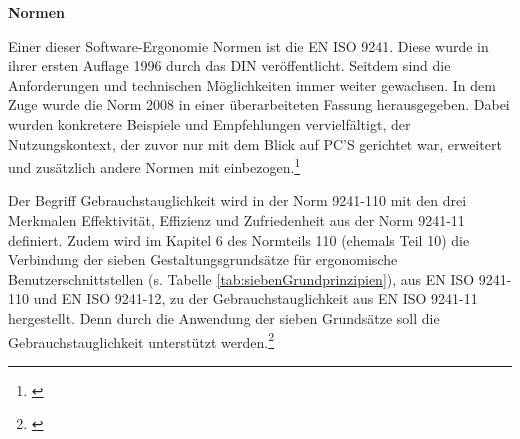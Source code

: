 \textbf{Normen}

Einer dieser Software-Ergonomie Normen ist die \gls{EN} \gls{ISO} 9241. Diese wurde in ihrer ersten Auflage 1996 durch das \gls{DIN} veröffentlicht. Seitdem sind die Anforderungen und technischen Möglichkeiten immer weiter gewachsen. In dem Zuge wurde die Norm 2008 in einer überarbeiteten Fassung herausgegeben. Dabei wurden konkretere Beispiele und Empfehlungen vervielfältigt, der Nutzungskontext, der zuvor nur mit dem Blick auf PC'S gerichtet war, erweitert und zusätzlich andere Normen mit einbezogen.\footnote{\cite[vgl.][]{Schneider2008}}

Der Begriff Gebrauchstauglichkeit wird in der Norm 9241-110 mit den drei Merkmalen Effektivität, Effizienz und Zufriedenheit aus der Norm 9241-11 definiert. Zudem wird im Kapitel 6 des Normteils 110 (ehemals Teil 10) die Verbindung der sieben Gestaltungsgrundsätze für ergonomische Benutzerschnittstellen (s. Tabelle \ref{tab:siebenGrundprinzipien}), aus EN ISO 9241-110 und EN ISO 9241-12, zu der Gebrauchstauglichkeit aus EN ISO 9241-11 hergestellt. Denn durch die Anwendung der sieben Grundsätze soll die Gebrauchstauglichkeit unterstützt werden.\footnote{\cite[vgl.][Kap. 6]{ISO9241-110}}

